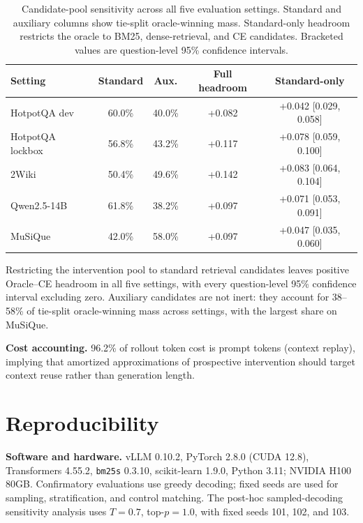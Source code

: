 \documentclass[10pt]{article}
\newcommand{\stitle}[1]{\vspace{0.4em}\noindent\textbf{#1}\hspace{0.6em}}
\begin{document}
\begin{table}[h]
\centering
\small
\caption{Candidate-pool sensitivity across all five evaluation settings.
Standard and auxiliary columns show tie-split oracle-winning mass.
Standard-only headroom restricts the oracle to BM25, dense-retrieval, and CE
candidates. Bracketed values are question-level 95\% confidence intervals.}
\label{tab:poolsens}
\begin{tabular}{lcccc}
\toprule
\textbf{Setting} & \textbf{Standard} & \textbf{Aux.} &
\textbf{Full headroom} & \textbf{Standard-only} \\
\midrule
HotpotQA dev     & 60.0\% & 40.0\% & +0.082 & +0.042 [0.029, 0.058] \\
HotpotQA lockbox & 56.8\% & 43.2\% & +0.117 & +0.078 [0.059, 0.100] \\
2Wiki            & 50.4\% & 49.6\% & +0.142 & +0.083 [0.064, 0.104] \\
Qwen2.5-14B      & 61.8\% & 38.2\% & +0.097 & +0.071 [0.053, 0.091] \\
MuSiQue          & 42.0\% & 58.0\% & +0.097 & +0.047 [0.035, 0.060] \\
\bottomrule
\end{tabular}
\end{table}

\noindent
Restricting the intervention pool to standard retrieval candidates leaves
positive Oracle--CE headroom in all five settings, with every
question-level 95\% confidence interval excluding zero. Auxiliary
candidates are not inert: they account for 38--58\% of tie-split
oracle-winning mass across settings, with the largest share on MuSiQue.

\stitle{Cost accounting.}
96.2\% of rollout token cost is prompt tokens (context replay), implying
that amortized approximations of prospective intervention should target
context reuse rather than generation length.

\section{Reproducibility}
\label{sec:repro}

\stitle{Software and hardware.}
vLLM 0.10.2, PyTorch 2.8.0 (CUDA 12.8), Transformers 4.55.2,
\texttt{bm25s} 0.3.10, scikit-learn 1.9.0, Python 3.11; NVIDIA H100 80GB.
Confirmatory evaluations use greedy decoding; fixed seeds are used for
sampling, stratification, and control matching. The post-hoc
sampled-decoding sensitivity analysis uses $T=0.7$, top-$p=1.0$, with fixed
seeds 101, 102, and 103.
\end{document}

